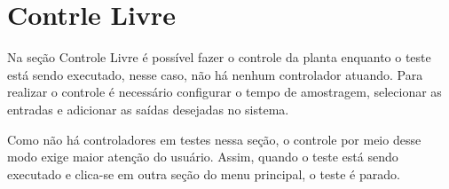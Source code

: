 
\chapter{Contrle Livre}%
\label{chapter:controle-livre}

Na seção Controle Livre é possível fazer o controle da planta enquanto o teste está sendo executado, nesse caso, não há nenhum controlador atuando. Para realizar o controle é necessário configurar o tempo de amostragem, selecionar as entradas e adicionar as saídas desejadas no sistema. 

Como não há controladores em testes nessa seção, o controle por meio desse modo exige maior atenção do usuário. Assim, quando o teste está sendo executado e clica-se em outra seção do menu principal, o teste é parado.



